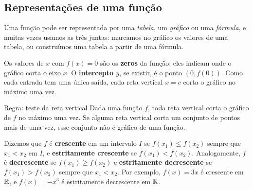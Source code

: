 \subsection{Representações de uma função}

Uma função pode ser representada por uma \emph{tabela}, um \emph{gráfico} ou uma
\emph{fórmula}, e muitas vezes usamos as três juntas: marcamos no gráfico os valores de uma
tabela, ou construímos uma tabela a partir de uma fórmula.

Os valores de $x$ com $f(x)=0$ são os \textbf{zeros} da função; eles indicam onde o gráfico
corta o eixo $x$. O \textbf{intercepto $y$}, se existir, é o ponto $(0,f(0))$. Como cada
entrada tem uma única saída, cada reta vertical $x=c$ corta o gráfico no máximo uma vez.

\begin{regra}{Regra: teste da reta vertical}
Dada uma função $f$, toda reta vertical corta o gráfico de $f$ no máximo uma vez. Se alguma
reta vertical corta um conjunto de pontos mais de uma vez, esse conjunto não é gráfico de
uma função.
\end{regra}


Dizemos que $f$ é \textbf{crescente} em um intervalo $I$ se $f(x_1)\le f(x_2)$ sempre que
$x_1<x_2$ em $I$, e \textbf{estritamente crescente} se $f(x_1)<f(x_2)$. Analogamente, $f$
é \textbf{decrescente} se $f(x_1)\ge f(x_2)$ e \textbf{estritamente decrescente} se
$f(x_1)>f(x_2)$ sempre que $x_1<x_2$. Por exemplo, $f(x)=3x$ é crescente em $\mathbb{R}$, e
$f(x)=-x^3$ é estritamente decrescente em $\mathbb{R}$.

